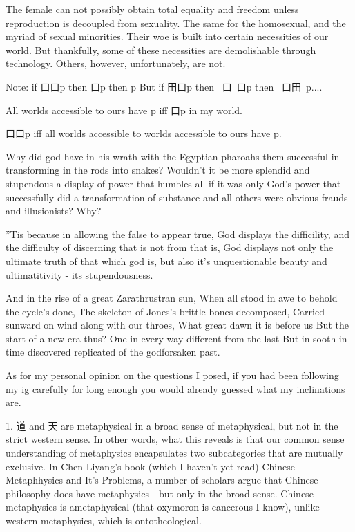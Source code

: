 The female can not possibly obtain total equality and freedom unless reproduction is decoupled from sexuality. The same for the homosexual, and the myriad of sexual minorities. Their woe is built into certain necessities of our world. But thankfully, some of these necessities are demolishable through technology. Others, however, unfortunately, are not. 

Note: if 口口p then 口p then p
But if 田口p then ~口~口p then ~口田~p....

All worlds accessible to ours have p iff 口p in my world. 

口口p iff all worlds accessible to worlds accessible to ours have p. 




Why did god have in his wrath with the Egyptian pharoahs them successful in transforming in the rods into snakes? Wouldn't it be more splendid and stupendous a display of power that humbles all if it was only God's power that successfully did a transformation of substance and all others were obvious frauds and illusionists? Why? 

''Tis because in allowing the false to appear true, God displays the difficility, and the difficulty of discerning that is not from that is, God displays not only the ultimate truth of that which god is, but also it's unquestionable beauty and ultimatitivity - its stupendousness. 


And in the rise of a great Zarathrustran sun, 
When all stood in awe to behold the cycle's done,
The skeleton of Jones's brittle bones decomposed,
Carried sunward on wind along with our throes,
What great dawn it is before us
But the start of a new era thus?
One in every way different from the last 
But in sooth in time discovered replicated of the godforsaken past.




As for my personal opinion on the questions I posed, if you had been following my ig carefully for long enough you would already guessed what my inclinations are. 

1. 道 and 天 are metaphysical in a broad sense of metaphysical, but not in the strict western sense. In other words, what this reveals is that our common sense understanding of metaphysics encapsulates two subcategories that are mutually exclusive. In Chen Liyang's book (which I haven't yet read) Chinese Metaphhysics and It's Problems, a number of scholars argue that Chinese philosophy does have metaphysics - but only in the broad sense. Chinese metaphysics is ametaphysical (that oxymoron is cancerous I know), unlike western metaphysics, which is ontotheological. 

